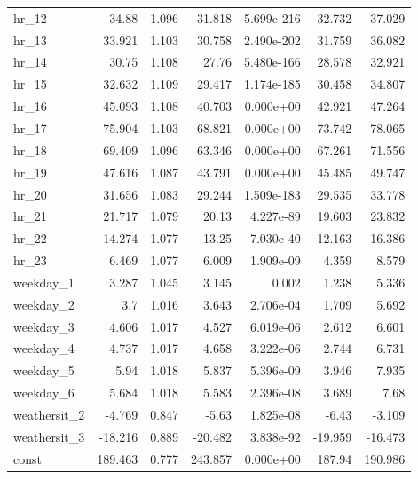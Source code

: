 \begin{longtable}{lrrrrrr}
hr\_12 & 34.88 & 1.096 & 31.818 & 5.699e-216 & 32.732 & 37.029 \\
hr\_13 & 33.921 & 1.103 & 30.758 & 2.490e-202 & 31.759 & 36.082 \\
hr\_14 & 30.75 & 1.108 & 27.76 & 5.480e-166 & 28.578 & 32.921 \\
hr\_15 & 32.632 & 1.109 & 29.417 & 1.174e-185 & 30.458 & 34.807 \\
hr\_16 & 45.093 & 1.108 & 40.703 & 0.000e+00 & 42.921 & 47.264 \\
hr\_17 & 75.904 & 1.103 & 68.821 & 0.000e+00 & 73.742 & 78.065 \\
hr\_18 & 69.409 & 1.096 & 63.346 & 0.000e+00 & 67.261 & 71.556 \\
hr\_19 & 47.616 & 1.087 & 43.791 & 0.000e+00 & 45.485 & 49.747 \\
hr\_20 & 31.656 & 1.083 & 29.244 & 1.509e-183 & 29.535 & 33.778 \\
hr\_21 & 21.717 & 1.079 & 20.13 & 4.227e-89 & 19.603 & 23.832 \\
hr\_22 & 14.274 & 1.077 & 13.25 & 7.030e-40 & 12.163 & 16.386 \\
hr\_23 & 6.469 & 1.077 & 6.009 & 1.909e-09 & 4.359 & 8.579 \\
weekday\_1 & 3.287 & 1.045 & 3.145 & 0.002 & 1.238 & 5.336 \\
weekday\_2 & 3.7 & 1.016 & 3.643 & 2.706e-04 & 1.709 & 5.692 \\
weekday\_3 & 4.606 & 1.017 & 4.527 & 6.019e-06 & 2.612 & 6.601 \\
weekday\_4 & 4.737 & 1.017 & 4.658 & 3.222e-06 & 2.744 & 6.731 \\
weekday\_5 & 5.94 & 1.018 & 5.837 & 5.396e-09 & 3.946 & 7.935 \\
weekday\_6 & 5.684 & 1.018 & 5.583 & 2.396e-08 & 3.689 & 7.68 \\
weathersit\_2 & -4.769 & 0.847 & -5.63 & 1.825e-08 & -6.43 & -3.109 \\
weathersit\_3 & -18.216 & 0.889 & -20.482 & 3.838e-92 & -19.959 & -16.473 \\
const & 189.463 & 0.777 & 243.857 & 0.000e+00 & 187.94 & 190.986 \\
\end{longtable}
